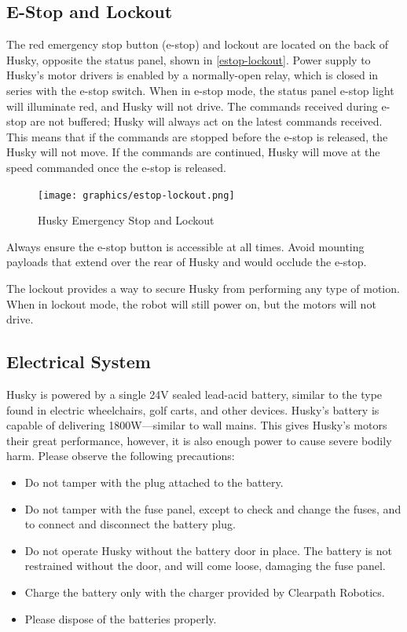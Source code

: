 \documentclass[]{clearpath-latex/clearpath-manual}
\begin{document}
\subsection{E-Stop and Lockout}

The red emergency stop button (e-stop) and lockout are located on the back of Husky, opposite the status panel,
shown in \autoref{estop-lockout}. Power supply to Husky’s motor drivers is enabled by a normally-open relay,
which is closed in series with the e-stop switch. When in e-stop mode, the status panel e-stop light will illuminate red,
and Husky will not drive. The commands received during e-stop are not buffered; Husky will always act on the latest commands
received. This means that if the commands are stopped before the e-stop is released, the Husky will not move. If the
commands are continued, Husky will move at the speed commanded once the e-stop is released.

\begin{figure}[h]
	\centering
	\texttt{[image: graphics/estop-lockout.png]}
	\caption{Husky Emergency Stop and Lockout}
	\label{estop-lockout}
\end{figure}

Always ensure the e-stop button is accessible at all times. Avoid mounting payloads that extend over the rear of Husky and would occlude the e-stop.

The lockout provides a way to secure Husky from performing any type of motion. When in lockout mode, the robot will still power on, but the motors will not drive.

\subsection{Electrical System}
Husky is powered by a single 24V sealed lead-acid battery, similar to the type found in electric wheelchairs, golf carts,
and other devices. Husky’s battery is capable of delivering 1800W—similar to wall mains. This gives Husky’s motors their
great performance, however, it is also enough power to cause severe bodily harm. Please observe the following precautions:

\begin{itemize}
	\item Do not tamper with the plug attached to the battery.
	\item Do not tamper with the fuse panel, except to check and change the fuses, and to connect and disconnect the battery plug.
	\item Do not operate Husky without the battery door in place. The battery is not restrained without the door, and will come loose, damaging the fuse panel.
	\item Charge the battery only with the charger provided by Clearpath Robotics.
	\item Please dispose of the batteries properly.
\end{itemize}
\end{document}

